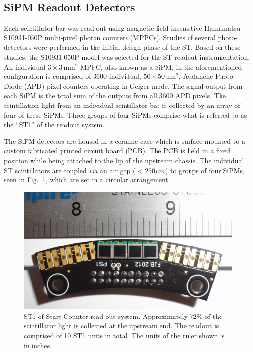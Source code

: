 \subsection{SiPM Readout Detectors} \label{sec:design_sipms}

Each scintillator bar was read out using magnetic field insensitive Hamamatsu S10931-050P multi-pixel photon counters (MPPCs)\cite{hamamatsu}.  Studies of several photo-detectors were performed in the initial deisgn phase of the ST\cite{barbosa_sipm}. Based on these studies, the S10931-050P model was selected for the ST readout instrumentation. An individual $\mathrm{3 \times 3\ mm^2}$ MPPC, also known as a SiPM, in the aforementioned configuration is comprised of 3600 individual, $\mathrm{50 \times 50\ \mu m^2}$, Avalanche Photo-Diode (APD) pixel counters operating in Geiger mode. The signal output from each SiPM is the total sum of the outputs from all 3600 APD pixels\cite{sipm_spec}.  The scintillation light from an individual scintillator bar is collected by an array of four of these SiPMs.  Three groups of four SiPMs comprise what is referred to as the ``ST1'' of the readout system.

The SiPM detectors are housed in a ceramic case which is surface mounted to a custom fabricated printed circuit board (PCB).  The PCB is held in a fixed position while being attached to the lip of the upstream chassis.  The individual ST scintillators are coupled \emph{via} an air gap ($< 250 \mu m$) to groups of four SiPMs, seen in Fig.~\ref{fig:st1_mounted}, which are set in a circular arrangement.
	\begin{figure}[!htb]
		\centering
		\includegraphics[width=1.0\columnwidth]{design/figs/st1_ruler}
		\caption{ST1 of Start Counter read out system. Approximately 72\% of the scintillator light is collected at the upstream end.  The readout is comprised of 10 ST1 units in total.  The units of the ruler shown is in inches.}
		\label{fig:st1_mounted}
	\end{figure}

